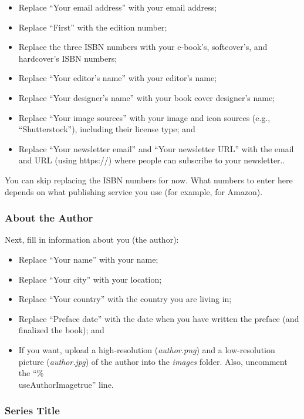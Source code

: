 \begin{itemize}
\item Replace ``Your email address'' with your email address;
\item Replace ``First'' with the edition number;
\item Replace the three ISBN numbers with your e-book's, softcover's, and hardcover's ISBN numbers; 
\item Replace ``Your editor's name'' with your editor's name;
\item Replace ``Your designer's name'' with your book cover designer's name;
\item Replace ``Your image sources'' with your image and icon sources (e.g., ``Shutterstock''), including their license type; and
\item Replace ``Your newsletter email'' and ``Your newsletter URL'' with the email and URL (using https://) where people can subscribe to your newsletter..
\end{itemize}

You can skip replacing the ISBN numbers for now. What numbers to enter here depends on what publishing service you use (for example, for Amazon).


\subsubsection{About the Author}

Next, fill in information about you (the author):

\begin{itemize}
    \item Replace ``Your name'' with your name;
    \item Replace ``Your city'' with your location;
    \item Replace ``Your country'' with the country you are living in;
    \item Replace ``Preface date'' with the date when you have written the preface (and finalized the book); and
    \item If you want, upload a high-resolution (\textit{author.png}) and a low-resolution picture (\textit{author.jpg}) of the author into the \textit{images} folder. Also, uncomment the ``\%\\useAuthorImagetrue'' line.
\end{itemize}




\subsubsection{Series Title}

